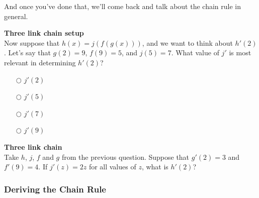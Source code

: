 \documentclass[pdftex, brazil, 12pt, twoside]{article}
\begin{document}
\begin{figure}[H]
  \begin{center}
  \end{center}
\end{figure}

And once you've done that, we'll come back
and talk about the chain rule in general.

\begin{exercise}
  \textbf{Three link chain setup}\\%
  Now suppose that $h(x)= j(f(g(x)))$, and we want to think about
  $h'(2)$. Let's say that $g(2)=9$, $f(9)=5$, and $j(5)=7$. What value of
  $j'$ is most relevant in determining $h'(2)$?
  \begin{itemize}[noitemsep]
  \item[$\bigcirc$] $j'(2)$
  \item[$\bigcirc$] $j'(5)$
  \item[$\bigcirc$] $j'(7)$
  \item[$\bigcirc$] $j'(9)$
  \end{itemize}
\end{exercise}

\begin{exercise}
  \textbf{Three link chain}\\%
  Take $h$, $j$, $f$ and $g$ from the previous question. Suppose that
  $g'(2) = 3$ and $f'(9)=4$. If $j'(z)=2z$ for all values of $z$, what is
  $h'(2)$?
\end{exercise}

\subsubsection{Deriving the Chain Rule}
\label{u2-chain-rule-deriving-chain-rule}
\end{document}
